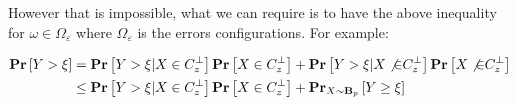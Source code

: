 \documentclass[manuscript,screen,review]{acmart}
\begin{document}
However that is impossible, what we can require is to have the above inequality for $\omega \in \Omega_{\varepsilon}$ where $\Omega_{\varepsilon}$ is the errors configurations. For example: 


\begin{equation*}
  \begin{split}
  \prb{Y > \xi }&=   \prb{Y > \xi | X \in C_{z}^{\perp} } \prb{ X \in C_{z}^{\perp}} +  \prb{Y > \xi | X \not{\in} C_{z}^{\perp} } \prb{ X \not{\in} C_{z}^{\perp}} \\
  & \le \prb{Y > \xi | X \in C_{z}^{\perp} } \prb{ X \in C_{z}^{\perp}} + \prbm{ Y \ge \xi  }{ X \sim \mathbf{B}_{p}  } 
  \end{split}
\end{equation*}

\end{document}
